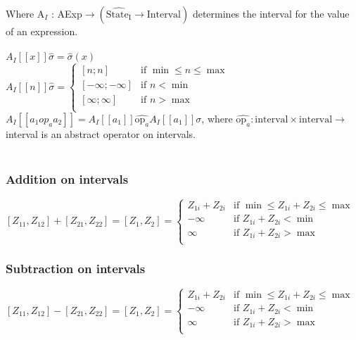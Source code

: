Where A$_I$ : AExp$ \rightarrow (\widehat{\text{State}_{\text{I}}} \rightarrow \text{Interval})$ determines the interval for the value of an expression.\\\\

$A_I[\![x]\!]\widehat{\sigma} = \widehat{\sigma}(x)$ \\
$A_I[\![n]\!]\widehat{\sigma} = 
     \begin{cases} 
        [n;n] & \text{if } \min \leq n \leq \max \\
        [-\infty;-\infty] & \text{if } n < \min\\
        [\infty;\infty] & \text{if } n > \max\\
     \end{cases}$\\

$A_I[\![a_1 op_a a_2 ]\!] = A_I[\![a_1]\!] \widehat{\text{op}_a} A_I[\![a_1]\!]\sigma $, where $  \widehat{\text{op}_a} : \text{interval} \times \text{interval} \rightarrow $  interval is an abstract operator on intervals.\\
\\
\subsubsection{Addition on intervals}
$[Z_{11},Z_{12}] + [Z_{21},Z_{22}] = [Z_{1},Z_{2}] =
     \begin{cases} 
        Z_{1i} + Z_{2i} & \text{if } \min \leq Z_{1i} + Z_{2i} \leq \max \\
        -\infty         & \text{if } Z_{1i} + Z_{2i} < \min \\
        \infty          & \text{if } Z_{1i} + Z_{2i} > \max\\
     \end{cases}
$


\subsubsection{Subtraction on intervals}
$[Z_{11},Z_{12}] - [Z_{21},Z_{22}] = [Z_{1},Z_{2}] =
     \begin{cases} 
        Z_{1i} + Z_{2i} & \text{if } \min \leq Z_{1i} + Z_{2i} \leq \max \\
        -\infty         & \text{if } Z_{1i} + Z_{2i} < \min \\
        \infty          & \text{if } Z_{1i} + Z_{2i} > \max\\
     \end{cases}
$

